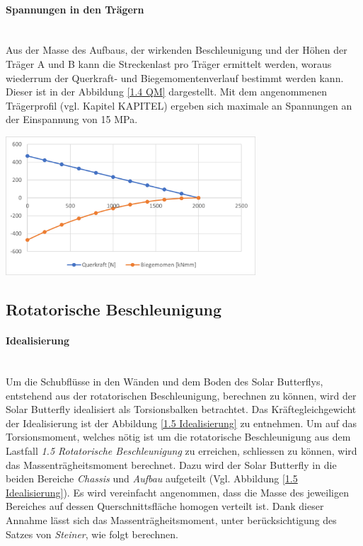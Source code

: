   \paragraph{Spannungen in den Trägern}\mbox{}\\
  Aus der Masse des Aufbaus, der wirkenden Beschleunigung und der Höhen der Träger A und B kann die Streckenlast pro Träger ermittelt werden, woraus wiederrum der Querkraft- und Biegemomentenverlauf bestimmt werden kann. Dieser ist in der Abbildung \ref{1.4 QM} dargestellt. Mit dem angenommenen Trägerprofil (vgl. Kapitel KAPITEL) ergeben sich maximale an Spannungen an der Einspannung von 15 MPa.

  \begin{center}
    \includegraphics[width=0.7\textwidth]{04_Figures/1.4 QM.png}
    \label{1.4 QM}
  \end{center}




\subsection{Rotatorische Beschleunigung}
\label{1.5 Rotatorische Beschleunigung}
\paragraph{Idealisierung}\mbox{}\\
Um die Schubflüsse in den Wänden und dem Boden des Solar Butterflys, entstehend aus der rotatorischen Beschleunigung, berechnen zu können, wird der Solar Butterfly idealisiert als Torsionsbalken betrachtet. Das Kräftegleichgewicht der Idealisierung ist der Abbildung \ref{1.5 Idealisierung} zu entnehmen. Um auf das Torsionsmoment, welches nötig ist um die rotatorische Beschleunigung aus dem Lastfall \emph{1.5 Rotatorische Beschleunigung} zu erreichen, schliessen zu können, wird das Massenträgheitsmoment berechnet. Dazu wird der Solar Butterfly in die beiden Bereiche \emph{Chassis} und \emph{Aufbau} aufgeteilt (Vgl. Abbildung \ref{1.5 Idealisierung}). Es wird vereinfacht angenommen, dass die Masse des jeweiligen Bereiches auf dessen Querschnittsfläche homogen verteilt ist. Dank dieser Annahme lässt sich das Massenträgheitsmoment, unter berücksichtigung des Satzes von \emph{Steiner}, wie folgt berechnen.

